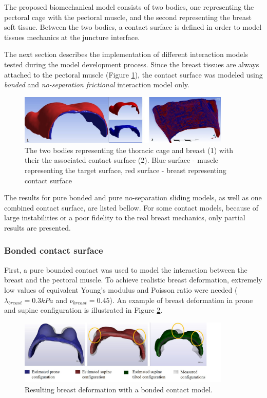  The proposed biomechanical model consists of two bodies, one representing the pectoral cage with the pectoral muscle,	  and the second representing the breast soft tissue. Between the two bodies, a contact surface is defined in order to model tissues mechanics at the juncture interface.
 
The next section describes the implementation of different interaction models tested during the model development process. Since the breast tissues are always attached to the pectoral muscle (Figure \ref{fig:contactsurface}), the contact surface was modeled using \textit{bonded} and \textit{no-separation frictional} interaction model only.

\begin{figure}[!h]
\centering
\includegraphics[width=0.9\textwidth,keepaspectratio]{figures/contactSurface.jpg} 
\caption{The two bodies representing the thoracic cage and breast (1) with their the associated contact surface (2).  Blue surface - muscle representing the target surface, red surface - breast representing contact surface}
\label{fig:contactsurface}
\end{figure}

The results for pure bonded and pure no-separation sliding models, as well as one combined contact surface, are listed bellow. For some contact models, because of large instabilities or a poor fidelity to the real breast mechanics, only partial results are presented.  

\subsubsection*{Bonded contact surface}

First, a pure bounded contact was used to model the interaction between the breast and the pectoral muscle. To achieve realistic breast deformation, extremely low values of equivalent Young's modulus and Poisson ratio were needed ($\lambda_{breast} = 0.3kPa$ and $\nu_{breast} = 0.45$).  
An example of breast deformation in prone and supine configuration is illustrated in Figure \ref{fig:bondedcontact}.

\begin{figure}[!h]
\centering
\includegraphics[width=0.9\textwidth,keepaspectratio]{figures/bondedcontact.jpg} 
\caption{Resulting breast deformation with a bonded contact model.}
\label{fig:bondedcontact}
\end{figure}

